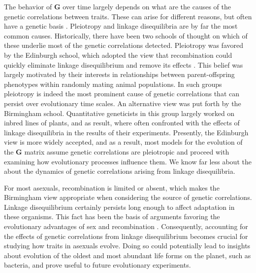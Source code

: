 \documentclass[11pt,twocolumn]{article}
\newcommand{\G}{\textbf{G }}
\begin{document}
The behavior of \G over time largely depends on what are the causes of the genetic correlations between traits. These can arise for different reasons, but often have a genetic basis \citep{Saltz2017}. Pleiotropy and linkage disequilibria are by far the most common causes. Historically, there have been two schools of thought on which of these underlie most of the genetic correlations detected. Pleiotropy was favored by the Edinburgh school, which adopted the view that recombination could quickly eliminate linkage disequilibrium and remove its effects \citep[Chapter~20]{fox2006evolutionary}. This belief was largely motivated by their interests in relationships between parent-offspring phenotypes within randomly mating animal populations. In such groups pleiotropy is indeed the most prominent cause of genetic correlations that can persist over evolutionary time scales. An alternative view was put forth by the Birmingham school. Quantitative geneticists in this group largely worked on inbred lines of plants, and as result, where often confronted with the effects of linkage disequilibria in the results of their experiments. Presently, the Edinburgh view is more widely accepted, and as a result, most models for the evolution of the \G  matrix assume genetic correlations are pleiotropic and proceed with examining how evolutionary processes influence them. We know far less about the about the dynamics of genetic correlations arising from linkage disequilibria.\par
% 
% 
% 
% 

For most asexuals, recombination is limited or absent, which makes the Birmingham view appropriate when considering the source of genetic correlations. Linkage disequilibrium certainly persists long enough to affect adaptation in these organisms. This fact has been the basis of arguments favoring the evolutionary advantages of sex and recombination \citep{Barton2005,Otto2009}. Consequently, accounting for the effects of genetic correlations from linkage disequilibrium becomes crucial for studying how traits in asexuals evolve. Doing so could potentially lead to insights about evolution of the oldest and most abundant life forms on the planet, such as bacteria, and prove useful to future evolutionary experiments.\par
\end{document}
